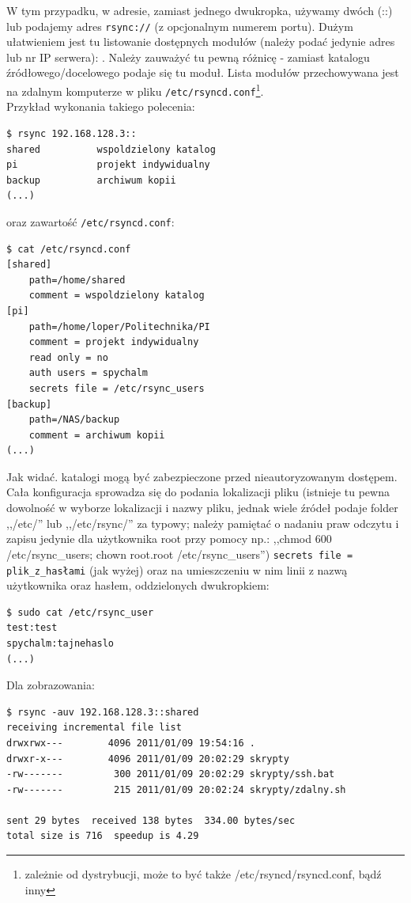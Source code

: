 W tym przypadku, w adresie, zamiast jednego dwukropka, używamy dwóch (::) lub podajemy adres \verb|rsync://| (z opcjonalnym numerem portu). Dużym ułatwieniem jest tu listowanie dostępnych modułów (należy podać jedynie adres lub nr IP serwera): . Należy zauważyć tu pewną różnicę - zamiast katalogu źródłowego/docelowego podaje się tu moduł. Lista modułów przechowywana jest na zdalnym komputerze w pliku \verb|/etc/rsyncd.conf|\footnote{zależnie od dystrybucji, może to być także /etc/rsyncd/rsyncd.conf, bądź inny}.\\
Przykład wykonania takiego polecenia:
\begin{verbatim}
$ rsync 192.168.128.3::
shared          wspoldzielony katalog
pi              projekt indywidualny
backup          archiwum kopii
(...)
\end{verbatim}
oraz zawartość \verb|/etc/rsyncd.conf|:
\begin{verbatim}
$ cat /etc/rsyncd.conf
[shared]
    path=/home/shared
    comment = wspoldzielony katalog
[pi]
    path=/home/loper/Politechnika/PI
    comment = projekt indywidualny
    read only = no
    auth users = spychalm
    secrets file = /etc/rsync_users
[backup]
    path=/NAS/backup
    comment = archiwum kopii
(...)
\end{verbatim}
Jak widać. katalogi mogą być zabezpieczone przed nieautoryzowanym dostępem. Cała konfiguracja sprowadza się do podania lokalizacji pliku (istnieje tu pewna dowolność w wyborze lokalizacji i nazwy pliku, jednak wiele źródeł podaje folder ,,/etc/'' lub ,,/etc/rsync/'' za typowy; należy pamiętać o nadaniu praw odczytu i zapisu jedynie dla użytkownika root przy pomocy np.: ,,chmod 600 /etc/rsync\_users; chown root.root /etc/rsync\_users'') \verb|secrets file = plik_z_hasłami| (jak wyżej) oraz na umieszczeniu w nim linii z nazwą użytkownika oraz hasłem, oddzielonych dwukropkiem: 
\begin{verbatim}
$ sudo cat /etc/rsync_user
test:test
spychalm:tajnehaslo
(...)
\end{verbatim}
\noindent
Dla zobrazowania:
\begin{verbatim}
$ rsync -auv 192.168.128.3::shared
receiving incremental file list
drwxrwx---        4096 2011/01/09 19:54:16 .
drwxr-x---        4096 2011/01/09 20:02:29 skrypty
-rw-------         300 2011/01/09 20:02:29 skrypty/ssh.bat
-rw-------         215 2011/01/09 20:02:24 skrypty/zdalny.sh

sent 29 bytes  received 138 bytes  334.00 bytes/sec
total size is 716  speedup is 4.29
\end{verbatim}

